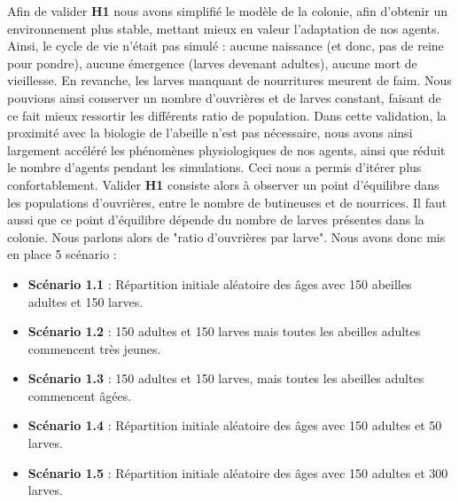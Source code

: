 			Afin de valider \textbf{H1} nous avons simplifié le modèle de la colonie, afin d'obtenir un environnement plus stable, mettant mieux en valeur l'adaptation de nos agents. Ainsi, le cycle de vie n'était pas simulé : aucune naissance (et donc, pas de reine pour pondre), aucune émergence (larves devenant adultes), aucune mort de vieillesse. En revanche, les larves manquant de nourritures meurent de faim. Nous pouvions ainsi conserver un nombre d'ouvrières et de larves constant, faisant de ce fait mieux ressortir les différents ratio de population. Dans cette validation, la proximité avec la biologie de l'abeille n'est pas nécessaire, nous avons ainsi largement accéléré les phénomènes physiologiques de nos agents, ainsi que réduit le nombre d'agents pendant les simulations. Ceci nous a permis d'itérer plus confortablement. Valider \textbf{H1} consiste alors à observer un point d'équilibre dans les populations d'ouvrières, entre le nombre de butineuses et de nourrices. Il faut aussi que ce point d'équilibre dépende du nombre de larves présentes dans la colonie. Nous parlons alors de "ratio d'ouvrières par larve". Nous avons donc mis en place 5 scénario :
			\begin{itemize}
				\item \textbf{Scénario 1.1} : Répartition initiale aléatoire des âges avec 150 abeilles adultes et 150 larves.
				\item \textbf{Scénario 1.2} : 150 adultes et 150 larves mais toutes les abeilles adultes commencent très jeunes.
				\item \textbf{Scénario 1.3} : 150 adultes et 150 larves, mais toutes les abeilles adultes commencent âgées.
				\item \textbf{Scénario 1.4} : Répartition initiale aléatoire des âges avec 150 adultes et 50 larves.
				\item \textbf{Scénario 1.5} : Répartition initiale aléatoire des âges avec 150 adultes et 300 larves.
			\end{itemize}
			
